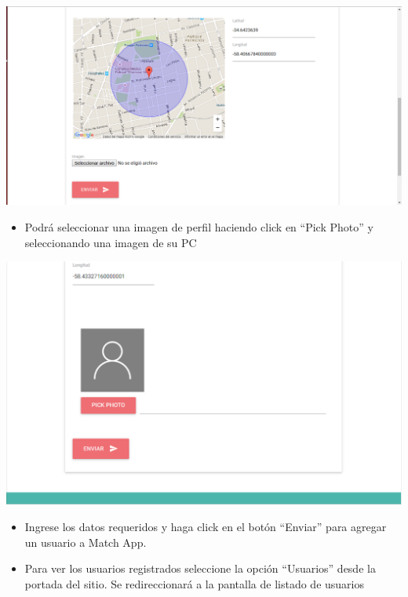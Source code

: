 \documentclass[letterpaper,10pt,english]{sphinxmanual}
\begin{document}
\includegraphics{shared_localizacion2.png}
\begin{itemize}
\item {} 
Podrá seleccionar una imagen de perfil haciendo click en ``Pick Photo'' y seleccionando una imagen de su PC

\end{itemize}

\includegraphics{profilephoto.png}
\begin{itemize}
\item {} 
Ingrese los datos requeridos y haga click en el botón “Enviar” para agregar un usuario a Match App.

\item {} 
Para ver los usuarios registrados seleccione la opción ``Usuarios'' desde la portada del sitio. Se redireccionará a la pantalla de listado de usuarios

\end{itemize}
\end{document}
